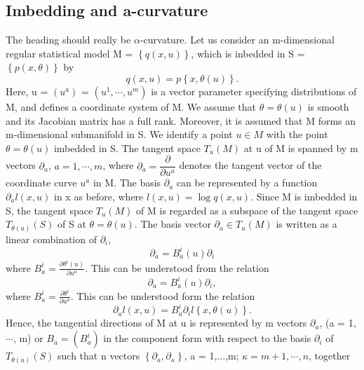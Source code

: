 \subsection{Imbedding and a-curvature}
The heading should really be $\alpha$-curvature. Let us consider an m-dimensional regular statistical model M
= $\left\lbrace q(x,u)\right\rbrace$, which is inbedded in S = $\left\lbrace p(x,\theta) \right\rbrace$ by
\begin{equation*}
 q(x,u) = p\left\lbrace x, \theta(u) \right\rbrace .
\end{equation*}
Here, u = $\left( u^a\right)$ = $\left( u^1,\cdots,u^m \right)$ is a vector parameter specifying distributions of M,
and defines a coordinate system of M. We assume that $\theta = \theta(u)$ is smooth and its Jacobian matrix has a
full rank. Moreover, it is assumed that M forms an m-dimensional submanifold in S. We identify a point $u \in M$ with 
the point $\theta = \theta(u)$ imbedded in S. The tangent space $T_u(M)$ at u of M is spanned by m vectors
$\partial_{a}$, $a = 1,\cdots, m$, where $\partial_{a}= \dfrac{\partial}{\partial u^{a}}$ denotes the tangent vector
of the coordinate curve $u^a$ in M. The basis $\partial_a$ can be represented by a function $\partial_a l(x,u)$ in x
as before, where $l(x,u) = \log q(x,u)$. Since M is imbedded in S, the tangent space $T_u(M)$ of M is regarded as
a subspace of the tangent space $T_{\theta(u)}(S)$ of S at $\theta = \theta(u).$ 
The basis vector $\partial_a \in T_u(M)$ is written as a linear combination of $\partial_i$,
\begin{equation*}
 \partial_a = B^i_a(u)\partial_i
\end{equation*}
where $B^i_a = \frac{\partial \theta^{i}(u)}{\partial u^{a}}$. This can be understood from the relation
\begin{equation*}
 \partial_{a} = B^{i}_a (u) \partial_i ,
\end{equation*}
where $B_a^{i} = \frac{\partial \theta ^{i}}{\partial u^{a}}$. This can be understood form the relation
\begin{equation*}
 \partial_a l(x,u) = B^i_a\partial_i l \left\lbrace x, \theta(u) \right\rbrace .
\end{equation*}
Hence, the tangential directions of M at u is represented by m vectors $\partial_a$, (a = 1,$\cdots$, m) or
$B_{a} = (B^i_a)$ in the component form with respect to the basis $\partial_i$ of $T_{\theta(u)}(S)$ such that
n vectors $\left\lbrace \partial_a, \partial_\kappa \right\rbrace$, a = 1,...,m; $\kappa = m+1, \cdots, n$, together
